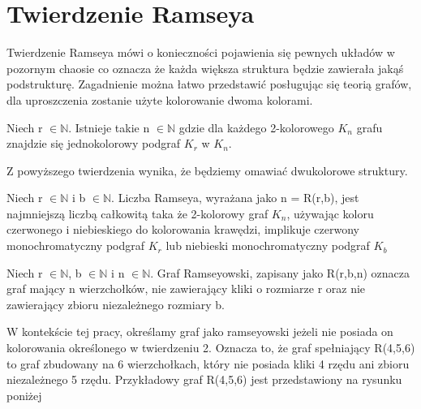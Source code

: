 \chapter{Twierdzenie Ramseya}
Twierdzenie Ramseya mówi o konieczności pojawienia się pewnych układów w pozornym chaosie co oznacza że każda większa struktura będzie zawierała jakąś podstrukturę. Zagadnienie można łatwo przedstawić posługując się teorią grafów, dla uproszczenia zostanie użyte kolorowanie dwoma kolorami.

\begin{theorem}
Niech r $\in \mathbb{N}$. Istnieje takie n $\in \mathbb{N}$  gdzie dla każdego 2-kolorowego $\mathit{K}_{n}$ grafu znajdzie się jednokolorowy podgraf $\mathit{K}_{r}$ w $\mathit{K}_{n}$.  \cite{theory} 
\end{theorem}

Z powyższego twierdzenia wynika, że będziemy omawiać dwukolorowe struktury. 

\begin{definition}
Niech r $\in \mathbb{N}$ i b $\in \mathbb{N}$. Liczba Ramseya, wyrażana jako n = R(r,b), jest najmniejszą liczbą całkowitą taka że 2-kolorowy graf $\mathit{K}_{n}$, używając koloru czerwonego i niebieskiego do kolorowania krawędzi, implikuje czerwony monochromatyczny podgraf $\mathit{K}_{r}$ lub niebieski monochromatyczny podgraf $\mathit{K}_{b}$
  \cite{theory} 
\end{definition}

\begin{definition}
Niech r $\in \mathbb{N}$, b $\in \mathbb{N}$ i n $\in \mathbb{N}$. Graf Ramseyowski, zapisany jako R(r,b,n) oznacza graf mający n wierzchołków, nie zawierający kliki o rozmiarze r oraz nie zawierający zbioru niezależnego rozmiary b.
  \cite{theory} 
\end{definition}

W kontekście tej pracy, określamy graf jako ramseyowski jeżeli nie posiada on kolorowania określonego w twierdzeniu 2. Oznacza to, że graf spełniający R(4,5,6) to graf zbudowany na 6 wierzchołkach, który nie posiada kliki 4 rzędu ani zbioru niezależnego 5 rzędu. Przykładowy graf R(4,5,6) jest przedstawiony na rysunku poniżej

 \begin{figure}[H]
  \centering
    \caption{}
 \end{figure}


